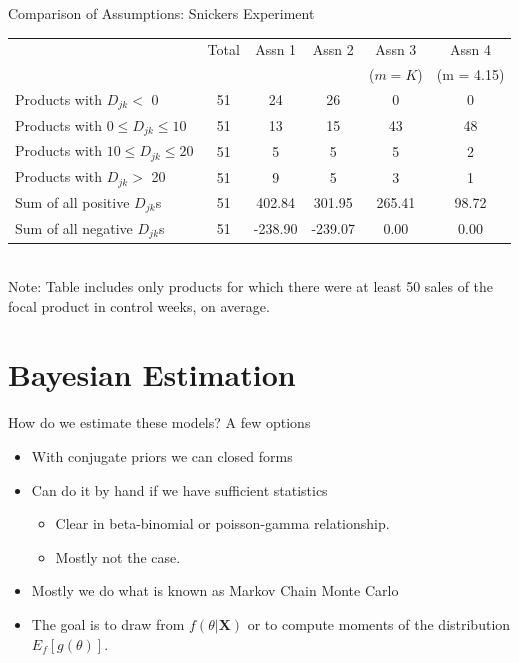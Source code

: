 \documentclass[aspectratio=169]{beamer}
\begin{document}
\begin{frame}{Comparison of Assumptions: Snickers Experiment}
\begin{table}
\footnotesize
\begin{tabular}{|l|ccccc|}
\multicolumn{1}{c}{} & \multicolumn{1}{c}{Total} & \multicolumn{1}{c}{Assn 1} & \multicolumn{1}{c}{Assn 2}   & \multicolumn{1}{c}{Assn 3} & \multicolumn{1}{c}{Assn 4} \\ 
\multicolumn{1}{c}{} 	&\multicolumn{1}{c}{} 	&\multicolumn{1}{c}{} 	&\multicolumn{1}{c}{} 	&\multicolumn{1}{c}{($m = K$)} 	&\multicolumn{1}{c}{(m = 4.15)} \\ \hline
Products with $D_{jk} < $ 0 & 51&24&26&0&0\\
Products with $0 \leq D_{jk} \leq 10$& 51&13&15&43&48\\
Products with $10 \leq D_{jk} \leq 20$ & 51&5&5&5&2\\
Products with $D_{jk} > $ 20 & 51&9&5&3&1\\ \hline
Sum of all positive $D_{jk}$s & 51&402.84&301.95&265.41&98.72\\
Sum of all negative $D_{jk}$s & 51&-238.90&-239.07&0.00&0.00\\
\hline
\end{tabular}\\
\footnotesize
Note: Table includes only products for which there were at least 50 sales of the focal product in control weeks, on average.
\end{table}
\end{frame}

\section{Bayesian Estimation}

\begin{frame}{How do we estimate these models?}
A few options
\begin{itemize}
\item With conjugate priors we can closed forms
\item Can do it by hand if we have \alert{sufficient statistics}
\begin{itemize}
\item Clear in beta-binomial or poisson-gamma relationship.
\item Mostly not the case.
\end{itemize}
\item Mostly we do what is known as \alert{Markov Chain Monte Carlo}
\item The goal is to draw from $f(\theta | \mathbf{X})$ or to compute moments of the distribution $E_f[g(\theta)]$.
\end{itemize}
\end{frame}
\end{document}
